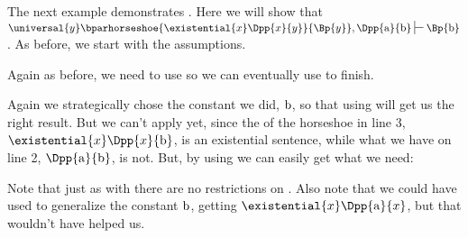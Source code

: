 The next example demonstrates . Here we will show that $\universal{\variable{y}}\bparhorseshoe{\existential{\variable{x}}\Dpp{\variable{x}}{\variable{y}}}{\Bp{\variable{y}}},\Dpp{\constant{a}}{\constant{b}}\sststile{}{}\Bp{\constant{b}}$.
As before, we start with the assumptions.
\begin{gproof}[\label{GQDExampleD}]
\end{gproof}
Again as before, we need to use  so we can eventually use  to finish. 
\begin{gproof}[\label{GQDExampleE}]
\end{gproof}
Again we strategically chose the constant we did, $\mathrm{b}$, so that using  will get us the right result. 
But we can't apply  yet, since the  of the horseshoe in line 3, $\existential{\variable{x}}\Dpp{\variable{x}}{\constant{b}}$, is an existential sentence, while what we have on line 2, $\Dpp{\constant{a}}{\constant{b}}$, is not. 
But, by using  we can easily get what we need:
\begin{gproof}[\label{GQDExampleF}]
\end{gproof}
Note that just as with  there are no restrictions on .
Also note that we could have used  to generalize the constant $\mathrm{b}$, getting $\existential{\variable{x}}\Dpp{\constant{a}}{\variable{x}}$, but that wouldn't have helped us.
